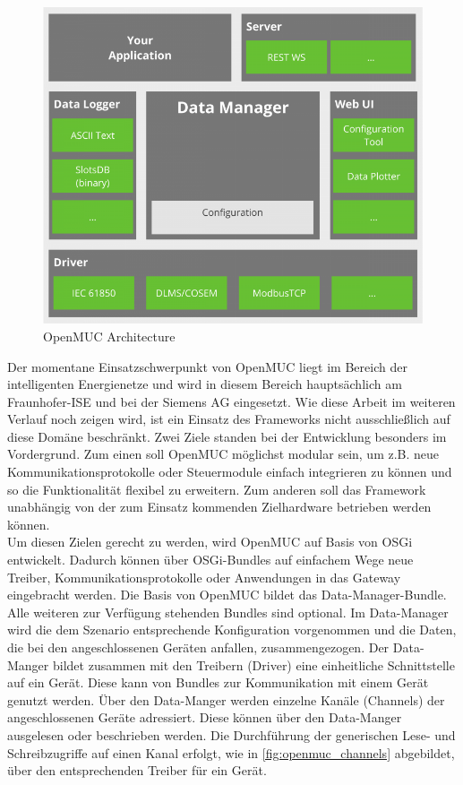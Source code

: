 \begin{figure}[h]
 \centering
 \includegraphics[scale=0.50]{content/pictures/openmuc_architecture.png}
 \caption{OpenMUC Architecture \cite{openmuc}}
 \label{fig:openmuc_architecture}
\end{figure}

Der momentane Einsatzschwerpunkt von OpenMUC liegt im Bereich der intelligenten Energienetze und wird in diesem Bereich hauptsächlich am Fraunhofer-\ac{ISE} und bei der Siemens AG eingesetzt.
Wie diese Arbeit im weiteren Verlauf noch zeigen wird, ist ein Einsatz des Frameworks nicht ausschließlich auf diese Domäne beschränkt.
Zwei Ziele standen bei der Entwicklung besonders im Vordergrund. Zum einen soll OpenMUC möglichst modular sein, um z.B. neue Kommunikationsprotokolle oder Steuermodule einfach
integrieren zu können und so die Funktionalität flexibel zu erweitern. Zum anderen soll das Framework unabhängig von der zum Einsatz kommenden Zielhardware betrieben werden können.\\

Um diesen Zielen gerecht zu werden, wird OpenMUC auf Basis von \ac{OSGi} entwickelt. Dadurch können über \ac{OSGi}-Bundles auf einfachem Wege neue Treiber, Kommunikationsprotokolle oder
Anwendungen in das Gateway eingebracht werden. Die Basis von OpenMUC bildet das Data-Manager-Bundle. Alle weiteren zur Verfügung stehenden Bundles sind optional. Im Data-Manager wird die dem Szenario entsprechende 
Konfiguration vorgenommen und die Daten, die bei den angeschlossenen Geräten anfallen, zusammengezogen.
Der Data-Manger bildet zusammen mit den Treibern (Driver) eine einheitliche Schnittstelle auf ein Gerät. Diese kann von Bundles zur Kommunikation mit einem Gerät genutzt werden.
Über den Data-Manger werden einzelne Kanäle (Channels) der angeschlossenen Geräte adressiert. Diese können über den Data-Manger ausgelesen oder beschrieben werden.
Die Durchführung der generischen Lese- und Schreibzugriffe auf einen Kanal erfolgt, wie in \autoref{fig:openmuc_channels} abgebildet, über den entsprechenden Treiber für ein Gerät.

